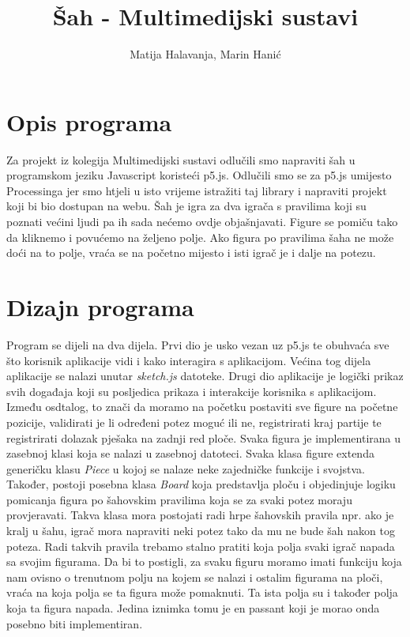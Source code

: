 \documentclass[11pt]{article}
\begin{document}
\author{Matija Halavanja, Marin Hanić}
\title{Šah - Multimedijski sustavi}
\maketitle
\tableofcontents

\section{Opis programa}
Za projekt iz kolegija Multimedijski sustavi odlučili smo napraviti šah u programskom jeziku Javascript koristeći p5.js.
Odlučili smo se za p5.js umijesto Processinga jer smo htjeli u isto vrijeme istražiti taj library i napraviti projekt koji
bi bio dostupan na webu. Šah je igra za dva igrača s pravilima koji su poznati većini ljudi pa ih sada nećemo ovdje objašnjavati.
Figure se pomiču tako da kliknemo i povućemo na željeno polje. Ako figura po pravilima šaha ne može doći na to polje, vraća se na
početno mijesto i isti igrač je i dalje na potezu.

\section{Dizajn programa}
Program se dijeli na dva dijela. Prvi dio je usko vezan uz p5.js te obuhvaća sve što korisnik aplikacije vidi i kako
interagira s aplikacijom. Većina tog dijela aplikacije se nalazi unutar \textit{sketch.js} datoteke. Drugi dio aplikacije je logički prikaz
svih događaja koji su posljedica prikaza i interakcije korisnika s aplikacijom. Između osdtalog, to znači da moramo na početku 
postaviti sve figure na početne pozicije, validirati je li određeni potez moguć ili ne, registrirati kraj partije te
registrirati dolazak pješaka na zadnji red ploče. Svaka figura je implementirana u zasebnoj klasi koja se nalazi u zasebnoj datoteci.
Svaka klasa figure extenda generičku klasu \textit{Piece} u kojoj se nalaze neke zajedničke funkcije i svojstva. Također, postoji posebna
klasa \textit{Board} koja predstavlja ploču i objedinjuje logiku pomicanja figura po šahovskim pravilima koja se za svaki potez moraju
provjeravati. Takva klasa mora postojati radi hrpe šahovskih pravila npr. ako je kralj u šahu, igrač mora napraviti neki potez tako da mu ne
bude šah nakon tog poteza. Radi takvih pravila trebamo stalno pratiti koja polja svaki igrač napada sa svojim figurama. Da bi to postigli,
za svaku figuru moramo imati funkciju koja nam ovisno o trenutnom polju na kojem se nalazi i ostalim figurama na ploči, vraća na koja polja
se ta figura može pomaknuti. Ta ista polja su i također polja koja ta figura napada. Jedina iznimka tomu je en passant koji je morao onda posebno
biti implementiran.
\end{document}
